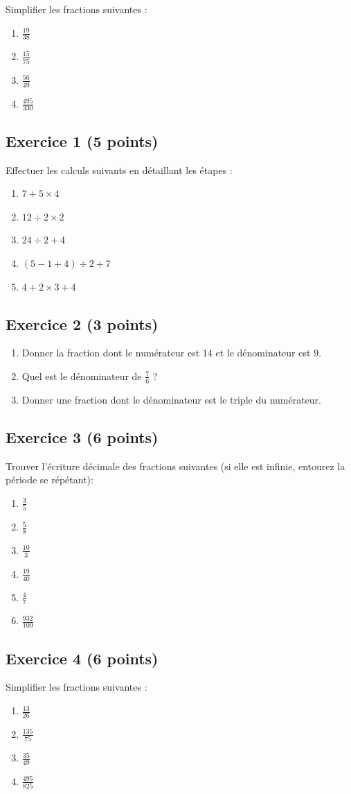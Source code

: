 \documentclass[14 pt]{extarticle}
\theoremstyle{plain}
\begin{document}
 Simplifier les fractions suivantes : 
 \begin{enumerate}
 \item $\frac{19}{38}$
 \item $\frac{15}{75}$
 \item $\frac{56}{49}$
 \item $\frac{495}{330}$
 \end{enumerate}
 
 
 
\newpage  

 \subsection*{Exercice 1 (5 points)}
 
 Effectuer les calculs suivants en détaillant les étapes : 
 \begin{enumerate}
 \item $7 + 5 \times 4$
 \item $ 12 \div 2 \times 2$
 \item $ 24 \div 2 + 4$
 \item $ (5 - 1 + 4) \div 2 + 7$
 \item $ 4 + 2 \times 3 + 4$
 \end{enumerate} 
 \subsection*{Exercice 2 (3 points)}
 
 \begin{enumerate}
 \item Donner la fraction dont le numérateur est $14$ et le dénominateur est $9$. 
 \item Quel est le dénominateur de $\frac76$ ?
 \item Donner une fraction dont le dénominateur est le triple du numérateur. 
 \end{enumerate}
 
 \subsection*{Exercice 3 (6 points)}
Trouver l'écriture décimale des fractions suivantes (si elle est infinie, entourez la période se répétant): 
\begin{enumerate}
\item $\frac35$
\item $\frac58$
\item $\frac{10}3$
\item $\frac{19}{40}$
\item $\frac47$
\item $\frac{932}{100}$
\end{enumerate}
 \subsection*{Exercice 4 (6 points)}
 
 Simplifier les fractions suivantes : 
 \begin{enumerate}
 \item $\frac{13}{26}$
 \item $\frac{135}{75}$
 \item $\frac{35}{49}$
 \item $\frac{495}{825}$
 \end{enumerate}
 
 
 
\newpage  
 
 	
\end{document}
